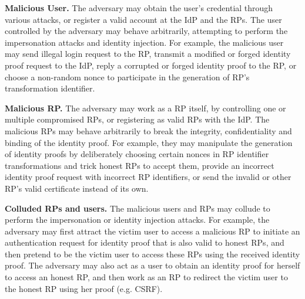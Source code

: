 \vspace{1mm}\noindent \textbf{Malicious User.} %
The adversary may obtain the user's credential through various attacks, or register a valid account at the IdP and the RPs.
The user controlled by the adversary may behave arbitrarily, attempting to perform the impersonation attacks and identity injection.
For example, the malicious user  may send illegal login request to the RP,
transmit a modified or forged identity proof request to the IdP,
reply a corrupted or forged identity proof to the RP, or choose a non-random nonce to participate in the generation of RP's transformation identifier.

\vspace{1mm}\noindent \textbf{Malicious RP.} %
The adversary may work as a RP itself, by controlling one or multiple compromised RPs, or registering as valid RPs with the IdP.
The malicious RPs may behave arbitrarily to break the integrity, confidentiality and binding of the identity proof.
For example, they may manipulate the generation of identity proofs by deliberately choosing certain nonces in RP identifier transformations and trick honest RPs to accept them,
provide an incorrect identity proof request with incorrect RP identifiers,
or send the invalid or other RP's valid certificate instead of its own. %


\vspace{1mm}\noindent \textbf{Colluded RPs and users.} The malicious users and RPs may collude to perform the impersonation or identity injection attacks.
For example, %
the adversary may first attract the victim user to access a malicious RP to initiate an authentication request for identity proof that is also valid to honest RPs, and then pretend to be the victim user to access these RPs using the received identity proof. %
The adversary may also act as a user to obtain an identity proof for herself to access an honest RP, and then work as an RP to redirect the victim user to the honest RP using her proof (e.g. CSRF).

